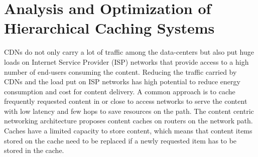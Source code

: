 \chapter{Analysis and Optimization of Hierarchical Caching Systems}\label{chap:hierarchical}

CDNs do not only carry a lot of traffic among the data-centers but also put huge loads on Internet Service Provider (ISP) networks that provide access to a high number of end-users consuming the content.
Reducing the traffic carried by CDNs and the load put on ISP networks has high potential to reduce energy consumption and cost for content delivery.
A common approach is to cache frequently requested content in or close to access networks to serve the content with low latency and few hops to save resources on the path.
The content centric networking architecture proposes content caches on routers on the network path.
Caches have a limited capacity to store content, which means that content items stored on the cache need to be replaced if a newly requested item has to be stored in the cache.

